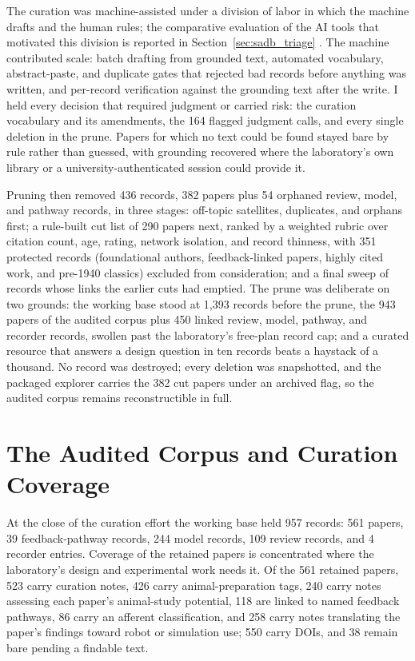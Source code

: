 The curation was machine-assisted under a division of labor in which the machine drafts and the human rules; the comparative evaluation of the AI tools that motivated this division is reported in Section~\ref{sec:sadb_triage} \citep{bolen_using_2024}. The machine contributed scale: batch drafting from grounded text, automated vocabulary, abstract-paste, and duplicate gates that rejected bad records before anything was written, and per-record verification against the grounding text after the write. I held every decision that required judgment or carried risk: the curation vocabulary and its amendments, the 164 flagged judgment calls, and every single deletion in the prune. Papers for which no text could be found stayed bare by rule rather than guessed, with grounding recovered where the laboratory's own library or a university-authenticated session could provide it.

Pruning then removed 436 records, 382 papers plus 54 orphaned review, model, and pathway records, in three stages: off-topic satellites, duplicates, and orphans first; a rule-built cut list of 290 papers next, ranked by a weighted rubric over citation count, age, rating, network isolation, and record thinness, with 351 protected records (foundational authors, feedback-linked papers, highly cited work, and pre-1940 classics) excluded from consideration; and a final sweep of records whose links the earlier cuts had emptied. The prune was deliberate on two grounds: the working base stood at 1,393 records before the prune, the 943 papers of the audited corpus plus 450 linked review, model, pathway, and recorder records, swollen past the laboratory's free-plan record cap; and a curated resource that answers a design question in ten records beats a haystack of a thousand. No record was destroyed; every deletion was snapshotted, and the packaged explorer carries the 382 cut papers under an archived flag, so the audited corpus remains reconstructible in full.

\section{The Audited Corpus and Curation Coverage}\label{sec:sadb_corpus}

At the close of the curation effort the working base held 957 records: 561 papers, 39 feedback-pathway records, 244 model records, 109 review records, and 4 recorder entries. Coverage of the retained papers is concentrated where the laboratory's design and experimental work needs it. Of the 561 retained papers, 523 carry curation notes, 426 carry animal-preparation tags, 240 carry notes assessing each paper's animal-study potential, 118 are linked to named feedback pathways, 86 carry an afferent classification, and 258 carry notes translating the paper's findings toward robot or simulation use; 550 carry DOIs, and 38 remain bare pending a findable text.

